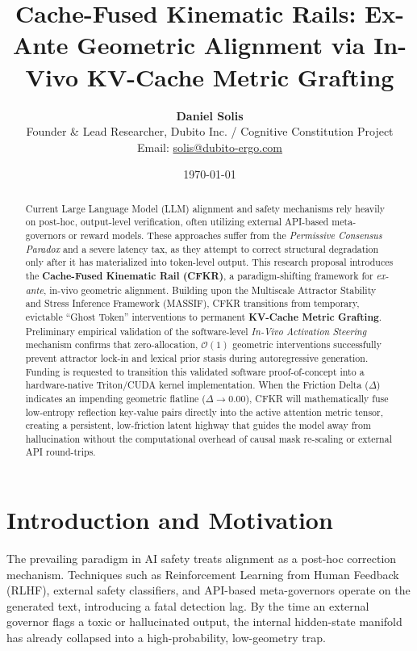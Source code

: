 \documentclass[11pt]{article}
\title{\textbf{Cache-Fused Kinematic Rails: Ex-Ante Geometric Alignment via In-Vivo KV-Cache Metric Grafting}}
\author{\textbf{Daniel Solis} \\ Founder \& Lead Researcher, Dubito Inc. / Cognitive Constitution Project \\ \small Email: \href{mailto:solis@dubito-ergo.com}{solis@dubito-ergo.com}}
\date{\today}
\begin{document}
\maketitle

\begin{abstract}
Current Large Language Model (LLM) alignment and safety mechanisms rely heavily on post-hoc, output-level verification, often utilizing external API-based meta-governors or reward models. These approaches suffer from the \textit{Permissive Consensus Paradox} and a severe latency tax, as they attempt to correct structural degradation only after it has materialized into token-level output. This research proposal introduces the \textbf{Cache-Fused Kinematic Rail (CFKR)}, a paradigm-shifting framework for \textit{ex-ante}, in-vivo geometric alignment. Building upon the Multiscale Attractor Stability and Stress Inference Framework (MASSIF), CFKR transitions from temporary, evictable ``Ghost Token'' interventions to permanent \textbf{KV-Cache Metric Grafting}. Preliminary empirical validation of the software-level \textit{In-Vivo Activation Steering} mechanism confirms that zero-allocation, $\mathcal{O}(1)$ geometric interventions successfully prevent attractor lock-in and lexical prior stasis during autoregressive generation. Funding is requested to transition this validated software proof-of-concept into a hardware-native Triton/CUDA kernel implementation. When the Friction Delta ($\Delta$) indicates an impending geometric flatline ($\Delta \to 0.00$), CFKR will mathematically fuse low-entropy reflection key-value pairs directly into the active attention metric tensor, creating a persistent, low-friction latent highway that guides the model away from hallucination without the computational overhead of causal mask re-scaling or external API round-trips.
\end{abstract}

\section{Introduction and Motivation}
The prevailing paradigm in AI safety treats alignment as a post-hoc correction mechanism. Techniques such as Reinforcement Learning from Human Feedback (RLHF), external safety classifiers, and API-based meta-governors operate on the generated text, introducing a fatal detection lag. By the time an external governor flags a toxic or hallucinated output, the internal hidden-state manifold has already collapsed into a high-probability, low-geometry trap.
\end{document}
